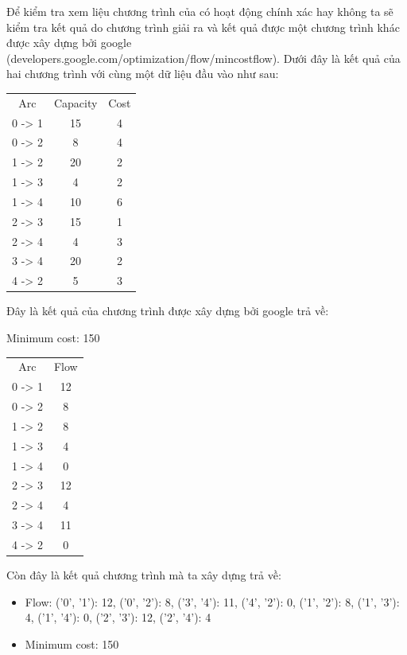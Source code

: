 \documentclass[a4paper]{article}
\begin{document}
Để kiểm tra xem liệu chương trình của có hoạt động chính xác hay không ta sẽ kiểm tra kết quả do chương trình giải ra và kết quả được một chương trình khác được xây dựng bởi google (developers.google.com/optimization/flow/mincostflow). Dưới đây là kết quả của hai chương trình với cùng một dữ liệu đầu vào như sau:

\begin{center}
\begin{tabular}{ccc}
    Arc & Capacity & Cost \\
    0 -> 1 & 15 & 4 \\
    0 -> 2 & 8 & 4 \\
    1 -> 2 & 20 & 2 \\
    1 -> 3 & 4 & 2 \\
    1 -> 4 & 10 & 6 \\
    2 -> 3 & 15 & 1 \\
    2 -> 4 & 4 & 3 \\
    3 -> 4 & 20 & 2 \\
    4 -> 2 & 5 & 3 \\
\end{tabular}
\end{center}

Đây là kết quả của chương trình được xây dựng bởi google trả về:
\begin{center}
Minimum cost: 150 \\
\begin{tabular}{cc}
    Arc & Flow \\
    0 -> 1 & 12 \\
    0 -> 2 & 8 \\
    1 -> 2 & 8 \\
    1 -> 3 & 4 \\
    1 -> 4 & 0 \\
    2 -> 3 & 12 \\
    2 -> 4 & 4 \\
    3 -> 4 & 11 \\
    4 -> 2 & 0 \\
\end{tabular}
\end{center}
Còn đây là kết quả chương trình mà ta xây dựng trả về: 
\begin{itemize}
\item Flow: {('0', '1'): 12, ('0', '2'): 8, ('3', '4'): 11, ('4', '2'): 0, ('1', '2'): 8, ('1', '3'): 4, ('1', '4'): 0, ('2', '3'): 12, ('2', '4'): 4}
\item Minimum cost: 150
\end{itemize}
\end{document}
